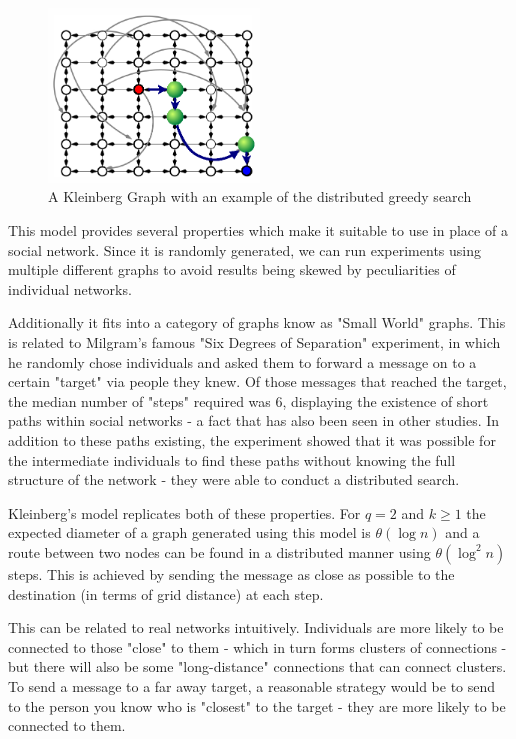 \documentclass[bsc,frontabs,twoside,singlespacing,parskip,deptreport]{infthesis}     %
\begin{document}
\begin{figure}[ht]
  \centering
    \includegraphics[width=0.5\textwidth]{Schabanel11_Kleinbergs_Network}
  \caption{A Kleinberg Graph with an example of the distributed greedy search\cite{Schabanel11}}
\end{figure}

This model provides several properties which make it suitable to use in place of a social network. Since it is randomly generated, we can run experiments using multiple different graphs to avoid results being skewed by peculiarities of individual networks. 

Additionally it fits into a category of graphs know as "Small World" graphs. This is related to Milgram's famous "Six Degrees of Separation" experiment\cite{Milgram67,TraversMilgram69}, in which he randomly chose individuals and asked them to forward a message on to a certain "target" via people they knew. Of those messages that reached the target, the median number of "steps" required was 6, displaying the existence of short paths within social networks - a fact that has also been seen in other studies\cite{MilgramBackup1,MilgramBackup2}. In addition to these paths existing, the experiment showed that it was possible for the intermediate individuals to find these paths without knowing the full structure of the network - they were able to conduct a distributed search. 

Kleinberg's model replicates both of these properties. For $q = 2$ and $k \ge 1$ the expected diameter of a graph generated using this model is $\theta (\log n)$ and a route between two nodes can be found in a distributed manner using $\theta (\log^{2}n)$ steps\cite{AnalyzingKleinberg}. This is achieved by sending the message as close as possible to the destination (in terms of grid distance) at each step.

This can be related to real networks intuitively. Individuals are more likely to be connected to those "close" to them - which in turn forms clusters of connections - but there will also be some "long-distance" connections that can connect clusters. To send a message to a far away target, a reasonable strategy would be to send to the person you know who is "closest" to the target - they are more likely to be connected to them.
\end{document}

